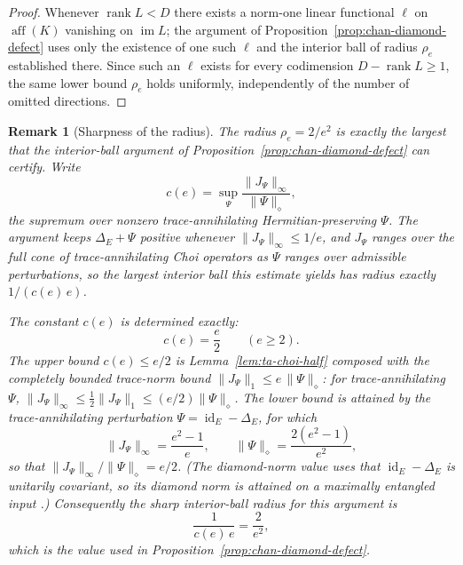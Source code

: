 \documentclass[11pt]{article}
\newtheorem{remark}[theorem]{Remark}
\DeclareMathOperator{\aff}{aff}
\DeclareMathOperator{\id}{id}
\DeclareMathOperator{\rank}{rank}
\begin{document}
\begin{proof}
Whenever $\rank L<D$ there exists a norm-one linear functional $\ell$ on
$\aff(K)$ vanishing on $\operatorname{im}L$; the argument of
Proposition~\ref{prop:chan-diamond-defect} uses only the existence of one such
$\ell$ and the interior ball of radius $\rho_e$ established there. Since such an
$\ell$ exists for every codimension $D-\rank L\ge1$, the same lower bound
$\rho_e$ holds uniformly, independently of the number of omitted directions.
\end{proof}

\begin{remark}[Sharpness of the radius]
\label{rem:diamond-radius-sharpness}
The radius $\rho_e=2/e^2$ is exactly the largest that the interior-ball
argument of Proposition~\ref{prop:chan-diamond-defect} can certify. Write
\[
c(e)=\sup_\Psi\frac{\|J_\Psi\|_\infty}{\|\Psi\|_\diamond},
\]
the supremum over nonzero trace-annihilating Hermitian-preserving $\Psi$. The
argument keeps $\Delta_E+\Psi$ positive whenever
$\|J_\Psi\|_\infty\le1/e$, and $J_\Psi$ ranges over the full cone of
trace-annihilating Choi operators as $\Psi$ ranges over admissible
perturbations, so the largest interior ball this estimate yields has radius
exactly $1/(c(e)\,e)$.

The constant $c(e)$ is determined exactly:
\[
c(e)=\frac{e}{2}\qquad(e\ge2).
\]
The upper bound $c(e)\le e/2$ is Lemma~\ref{lem:ta-choi-half} composed with the
completely bounded trace-norm bound $\|J_\Psi\|_1\le e\,\|\Psi\|_\diamond$: for
trace-annihilating $\Psi$,
$\|J_\Psi\|_\infty\le\tfrac12\|J_\Psi\|_1\le(e/2)\|\Psi\|_\diamond$. The lower
bound is attained by the trace-annihilating perturbation
$\Psi=\id_E-\Delta_E$, for which
\[
\|J_\Psi\|_\infty=\frac{e^2-1}{e},\qquad
\|\Psi\|_\diamond=\frac{2(e^2-1)}{e^2},
\]
so that $\|J_\Psi\|_\infty/\|\Psi\|_\diamond=e/2$. (The diamond-norm value uses
that $\id_E-\Delta_E$ is unitarily covariant, so its diamond norm is attained on
a maximally entangled input \cite[\S3.3]{Watrous2018}.) Consequently the
sharp interior-ball radius for this argument is
\[
\frac1{c(e)\,e}=\frac2{e^2},
\]
which is the value used in Proposition~\ref{prop:chan-diamond-defect}.


\end{remark}
\end{document}
